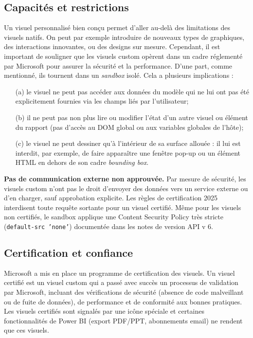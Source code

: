 \subsection*{Capacités et restrictions}
Un visuel personnalisé bien conçu permet d’aller au-delà des limitations des visuels natifs. On peut par exemple introduire de nouveaux types de graphiques, des interactions innovantes, ou des designs sur mesure. Cependant, il est important de souligner que les visuels custom opèrent dans un cadre réglementé par Microsoft pour assurer la sécurité et la performance. D’une part, comme mentionné, ils tournent dans un \textit{sandbox} isolé. Cela a plusieurs implications :
\begin{itemize}
  \item[(a)] le visuel ne peut pas accéder aux données du modèle qui ne lui ont pas été explicitement fournies via les champs liés par l’utilisateur\parencite{OkVizSandbox};
  \item[(b)] il ne peut pas non plus lire ou modifier l’état d’un autre visuel ou élément du rapport (pas d’accès au DOM global ou aux variables globales de l’hôte);
  \item[(c)] le visuel ne peut dessiner qu’à l’intérieur de sa surface allouée : il lui est interdit, par exemple, de faire apparaître une fenêtre pop-up ou un élément HTML en dehors de son cadre \textit{bounding box}\parencite{OkVizDropdown}.
\end{itemize}

\textbf{Pas de communication externe non approuvée.}
Par mesure de sécurité, les visuels custom n’ont pas le droit d’envoyer des données vers un service externe ou d’en charger, sauf approbation explicite. Les règles de certification 2025 interdisent toute requête sortante pour un visuel certifié\parencite{MicrosoftCertGuide2025}. Même pour les visuels non certifiés, le sandbox applique une Content Security Policy très stricte (\texttt{default-src 'none'}) documentée dans les notes de version API v 6\parencite{MicrosoftAPIv6CSP2025}.

\subsection*{Certification et confiance}
Microsoft a mis en place un programme de certification des visuels. Un visuel certifié est un visuel custom qui a passé avec succès un processus de validation par Microsoft, incluant des vérifications de sécurité (absence de code malveillant ou de fuite de données), de performance et de conformité aux bonnes pratiques\parencite{MicrosoftCertGuide2025}. Les visuels certifiés sont signalés par une icône spéciale et certaines fonctionnalités de Power BI (export PDF/PPT, abonnements email) ne rendent que ces visuels\parencite{OkVizExport}.


